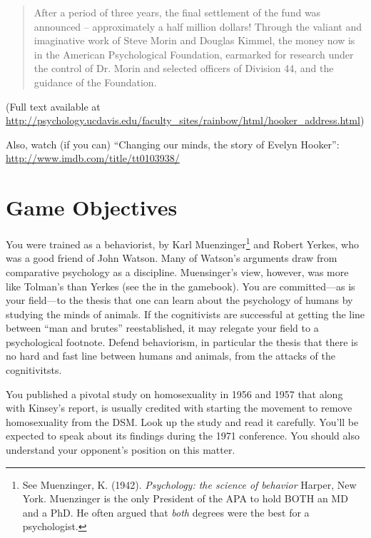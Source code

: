 \begin{refsection}
\begin{quote}
After a period of three years, the final settlement of the fund was announced – approximately a half million dollars! Through the valiant and imaginative work of Steve Morin and Douglas Kimmel, the money now is in the American Psychological Foundation, earmarked for research under the control of Dr. Morin and selected officers of Division 44, and the guidance of the Foundation.
\end{quote}

(Full text available at \url{http://psychology.ucdavis.edu/faculty_sites/rainbow/html/hooker_address.html}) 

Also, watch (if you can) “Changing our minds, the story of Evelyn Hooker”: \url{http://www.imdb.com/title/tt0103938/}

\section{Game Objectives}
\label{gameobjectives}

You were trained as a behaviorist, by Karl Muenzinger\footnote{See Muenzinger, K. (1942). \emph{Psychology: the science of behavior} Harper, New York. Muenzinger is the only President of the APA to hold BOTH an MD and a PhD. He often argued that \emph{both} degrees were the best for a psychologist.} and Robert Yerkes, who was a good friend of John Watson. Many of Watson's arguments draw from comparative psychology as a discipline. Muensinger's view, however, was more like Tolman's than Yerkes (see the  in the gamebook). You are committed—as is your field—to the thesis that one can learn about the psychology of humans by studying the minds of animals. If the cognitivists are successful at getting the line between “man and brutes” reestablished, it may relegate your field to a psychological footnote. Defend behaviorism, in particular the thesis that there is no hard and fast line between humans and animals, from the attacks of the cognitivitsts.

You published a pivotal study on homosexuality in 1956 and 1957 that along with Kinsey's report, is usually credited with starting the movement to remove homosexuality from the DSM. Look up the study and read it carefully. You'll be expected to speak about its findings during the 1971 conference. You should also understand your opponent's position on this matter.


\end{refsection}
